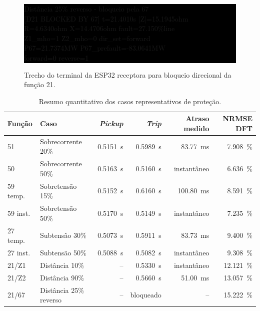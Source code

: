 \begin{figure}[H]
  \centering
  \caption{Trecho do terminal da ESP32 receptora para bloqueio direcional da função 21.}
  \label{fig:log-distancia-67-bloqueio}
  \begingroup
  \setlength{\fboxsep}{6pt}
  \colorbox{black}{%
    \begin{minipage}{0.90\textwidth}
      \color{white}\scriptsize\ttfamily
      Distância 25\% reverso - bloqueio pela 67\\
      {[D21 BLOCKED BY 67]} t=21.4010s |Z|=15.1945ohm\\
      \hspace*{1.8em}R=4.6340ohm X=14.4706ohm fault=27.150\%line\\
      \hspace*{1.8em}Z1\_mho=1 Z2\_mho=0 dir\_set=forward\\
      \hspace*{1.8em}P67=21.7374MW P67\_prefault=-83.0641MW\\
      \hspace*{1.8em}forward=0 reverse=1
    \end{minipage}
  }
  \endgroup
\end{figure}

\begin{table}[H]
  \centering
  \scriptsize
  \caption{Resumo quantitativo dos casos representativos de proteção.}
  \label{tab:resumo-protecoes-resultados}
  \begin{tabular}{llrrrr}
    \toprule
    Função & Caso & \textit{Pickup} & \textit{Trip} & Atraso medido & NRMSE DFT \\
    \midrule
    51 & Sobrecorrente 20\% & \SI{0,5151}{\second} & \SI{0,5989}{\second} & \SI{83,77}{\milli\second} & \SI{7,908}{\percent} \\
    50 & Sobrecorrente 50\% & \SI{0,5163}{\second} & \SI{0,5160}{\second} & instantâneo & \SI{6,636}{\percent} \\
    59 temp. & Sobretensão 15\% & \SI{0,5152}{\second} & \SI{0,6160}{\second} & \SI{100,80}{\milli\second} & \SI{8,591}{\percent} \\
    59 inst. & Sobretensão 50\% & \SI{0,5170}{\second} & \SI{0,5149}{\second} & instantâneo & \SI{7,235}{\percent} \\
    27 temp. & Subtensão 30\% & \SI{0,5073}{\second} & \SI{0,5911}{\second} & \SI{83,73}{\milli\second} & \SI{9,400}{\percent} \\
    27 inst. & Subtensão 50\% & \SI{0,5088}{\second} & \SI{0,5082}{\second} & instantâneo & \SI{9,308}{\percent} \\
    21/Z1 & Distância 10\% & -- & \SI{0,5330}{\second} & instantâneo & \SI{12,121}{\percent} \\
    21/Z2 & Distância 90\% & -- & \SI{0,5660}{\second} & \SI{51,00}{\milli\second} & \SI{13,057}{\percent} \\
    21/67 & Distância 25\% reverso & -- & bloqueado & -- & \SI{15,222}{\percent} \\
    \bottomrule
  \end{tabular}
\end{table}

